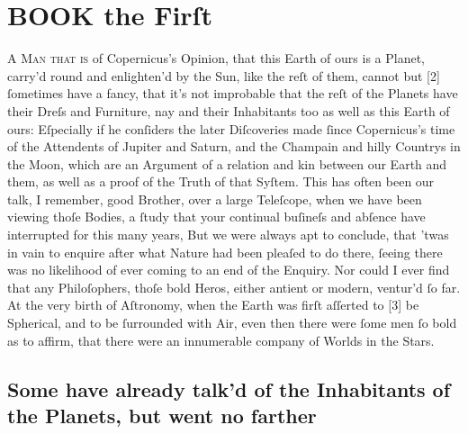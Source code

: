 \documentclass[letterpaper]{book}
\begin{document}
\tableofcontents
\mainmatter

\chapter{BOOK the Firſt}
\lettrine[lines=6, lraise=.26]{ A}{ Man that is} of Copernicus's Opinion, that this Earth of ours is a Planet,
carry'd round and enlighten'd by the Sun, like the reſt of them, cannot but
[2] ſometimes have a fancy, that it's not improbable that the reſt of the
Planets have their Dreſs and Furniture, nay and their Inhabitants too as
well as this Earth of ours: Eſpecially if he conſiders the later Diſcoveries
made ſince Copernicus's time of the Attendents of Jupiter and Saturn, and
the Champain and hilly Countrys in the Moon, which are an Argument
of a relation and kin between our Earth and them, as well as a proof of
the Truth of that Syſtem. This has often been our talk, I remember, good
Brother, over a large Teleſcope, when we have been viewing thoſe Bodies,
a ſtudy that your continual buſineſs and abſence have interrupted for this
many years, But we were always apt to conclude, that 'twas in vain to
enquire after what Nature had been pleaſed to do there, ſeeing there was
no likelihood of ever coming to an end of the Enquiry. Nor could I ever find
that any Philoſophers, thoſe bold Heros, either antient or modern, ventur'd
ſo far. At the very birth of Aſtronomy, when the Earth was firſt aſſerted
to [3] be Spherical, and to be ſurrounded with Air, even then there were
ſome men ſo bold as to affirm, that there were an innumerable company of
Worlds in the Stars.


\section{Some have already talk'd of the Inhabitants of the
Planets, but went no farther}
\end{document}
